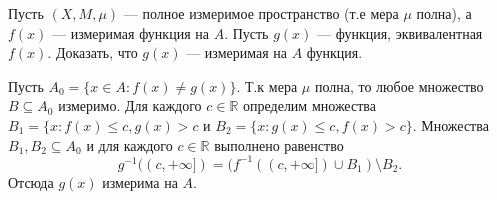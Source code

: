 \begin{task}{6}
Пусть $(X, M, \mu)$ --- полное измеримое пространство (т.е мера $\mu$ полна), а $f(x)$ --- измеримая функция на $A$. Пусть $g(x)$ --- функция, эквивалентная $f(x)$. Доказать, что $g(x)$ --- измеримая на $A$ функция.
\end{task}

\begin{solution}
Пусть $A_0 = \{x \in A: f(x) \neq g(x) \}$. Т.к мера $\mu$ полна, то любое множество $B \subseteq A_0$ измеримо. Для каждого $c \in \mathbb{R}$ определим множества $B_1 = \{x: f(x) \leqslant c, g(x) > c$ и $B_2 = \{x: g(x) \leqslant c, f(x) > c \}$. Множества $B_1, B_2 \subseteq A_0$ и для каждого $c \in \mathbb{R}$ выполнено равенство $$g^{-1}((c, +\infty]) = (f^{-1}((c, +\infty]) \cup B_1) \setminus B_2.$$ Отсюда $g(x)$ измерима на $A$.
\end{solution}